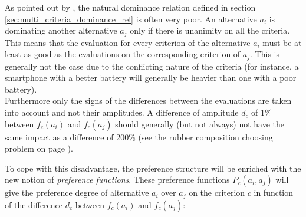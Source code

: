 As pointed out by \cite{brans1994promcalc}, the natural dominance relation defined in section \ref{sec:multi_criteria_dominance_rel} is often very poor.
An alternative $a_i$ is dominating another alternative $a_j$ only if there is unanimity on all the criteria. This means that the evaluation for every criterion of the alternative $a_i$ must be at least as good as the evaluations on the corresponding criterion of $a_j$. This is generally not the case due to the conflicting nature of the criteria (for instance, a smartphone with a better battery will generally be heavier than one with a poor battery). \\
Furthermore only the signs of the differences between the evaluations are taken into account and not their amplitudes.
A difference of amplitude $d_c$ of $1\%$ between $f_c(a_i)$ and $f_c(a_j)$ should generally (but not always) not have the same impact as a difference of $200\%$ (see the rubber composition choosing problem on page \pageref{sec:drawback_monocriteria}).


To cope with this disadvantage, the preference structure will be enriched with the new notion of \textit{preference functions}. These preference functions $P_c(a_i,a_j)$ will give the preference degree of alternative $a_i$ over $a_j$ on the criterion $c$ in function of the difference $d_c$ between $f_c(a_i)$ and $f_c(a_j)$:

